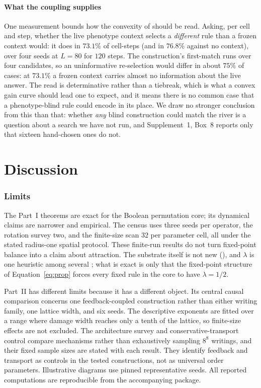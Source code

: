 \documentclass[man,12pt,floatsintext,donotrepeattitle]{apa7}
\newcommand{\secref}[1]{\emph{\nameref{#1}}}
\newcommand{\suppfindingref}[1]{Supplement~1, Box~#1}
\begin{document}
\subsection{What the coupling supplies}

One measurement bounds how the convexity of \secref{sec:gain} should be read.
Asking, per cell and step, whether the live phenotype context selects a
\emph{different} rule than a frozen context would: it does in $73.1$\% of
cell-steps (and in $76.8$\% against no context), over four seeds at $L=80$ for
$120$ steps. The construction's first-match runs over four candidates, so an
uninformative re-selection would differ in about $75$\% of cases: at $73.1$\% a
frozen context carries almost no information about the live answer. The read is
determinative rather than a tiebreak, which is what a convex gain curve should
lead one to expect, and it means there is no common case that a
phenotype-blind rule could encode in its place. We draw no stronger conclusion
from this than that: whether \emph{any} blind construction could match the
river is a question about a search we have not run, and
\suppfindingref{8} reports only that sixteen hand-chosen ones do not.



\part*{Discussion}
\label{part:discussion}

\section{Limits}
\label{sec:limits}

The Part~I theorems are exact for the Boolean permutation core; its dynamical
claims are narrower and empirical. The census uses three seeds per operator,
the rotation survey two, and the finite-size scan $32$ per parameter cell, all
under the stated radius-one spatial protocol. These finite-run results do not
turn fixed-point balance into a claim about attraction. The substrate itself is
not new (\secref{sec:object}), and $\lambda$ is one heuristic among several
\parencite{wuensche1999classifying}; what is exact is only that the fixed-point
structure of Equation~\eqref{eq:prop} forces every fixed rule in the core to
have $\lambda=1/2$.

Part~II has different limits because it has a different object. Its central
causal comparison concerns one feedback-coupled construction rather than
either writing family, one lattice width, and six seeds. The descriptive
exponents are fitted over a range where damage width reaches only a tenth of
the lattice, so finite-size effects are not excluded. The architecture survey
and conservative-transport control compare mechanisms rather than exhaustively
sampling $8^8$ writings, and their fixed sample sizes are stated with each
result. They identify feedback and transport as controls in the tested
constructions, not as universal order parameters. Illustrative diagrams use
pinned representative seeds. All reported computations are reproducible from
the accompanying package.
\end{document}
